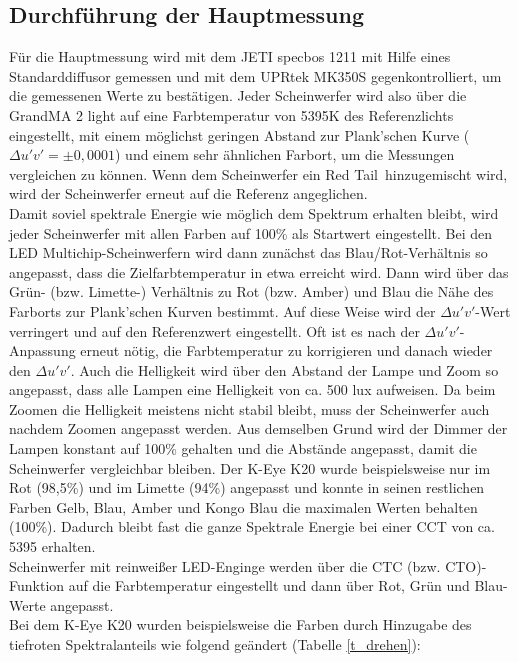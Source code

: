 \subsection{Durchführung der Hauptmessung}\label{mdurchführung}
 Für die Hauptmessung wird mit dem JETI specbos 1211 mit Hilfe eines Standarddiffusor gemessen und mit dem UPRtek MK350S gegenkontrolliert, um die gemessenen Werte zu bestätigen. Jeder Scheinwerfer wird also über die GrandMA 2 light auf eine Farbtemperatur von 5395K des Referenzlichts eingestellt, mit einem möglichst geringen Abstand zur Plank'schen Kurve ($ \Delta u'v'=\pm0,0001$) und einem sehr ähnlichen Farbort, um die Messungen vergleichen zu können. Wenn dem Scheinwerfer ein \glqq Red Tail\grqq\ hinzugemischt wird, wird der Scheinwerfer erneut auf die Referenz angeglichen.\\
Damit soviel spektrale Energie wie möglich dem Spektrum erhalten bleibt, wird jeder Scheinwerfer mit allen Farben auf 100\% als Startwert eingestellt. Bei den LED Multichip-Scheinwerfern wird dann zunächst das Blau/Rot-Verhältnis so angepasst, dass die Zielfarbtemperatur in etwa erreicht wird. Dann wird über das Grün- (bzw. Limette-) Verhältnis  zu Rot (bzw. Amber) und Blau die Nähe des Farborts zur Plank'schen Kurven bestimmt. Auf diese Weise wird der $\Delta u'v'$-Wert verringert und auf den Referenzwert eingestellt. Oft ist es nach der $\Delta u'v'$-Anpassung erneut nötig, die Farbtemperatur zu korrigieren und danach wieder den $\Delta u'v'$. Auch die Helligkeit wird über den Abstand der Lampe und Zoom so angepasst, dass alle Lampen eine Helligkeit von ca. 500 lux aufweisen. Da beim Zoomen die Helligkeit meistens nicht stabil bleibt, muss der Scheinwerfer auch nachdem Zoomen angepasst werden. Aus demselben Grund wird der Dimmer der Lampen konstant auf 100\% gehalten und die Abstände angepasst, damit die Scheinwerfer vergleichbar bleiben. Der K-Eye K20 wurde beispielsweise nur im Rot (98,5\%) und im Limette (94\%) angepasst und konnte in seinen restlichen Farben Gelb, Blau, Amber und Kongo Blau die maximalen Werten behalten (100\%). Dadurch bleibt fast die ganze Spektrale Energie bei einer CCT von ca. 5395 erhalten.\\
Scheinwerfer mit reinweißer LED-Enginge werden über die CTC (bzw. CTO)-Funktion auf die Farbtemperatur eingestellt und dann über Rot, Grün und Blau-Werte angepasst.\\
Bei dem K-Eye K20 wurden beispielsweise die Farben durch Hinzugabe des tiefroten Spektralanteils wie folgend geändert (Tabelle \ref{t_drehen}):


